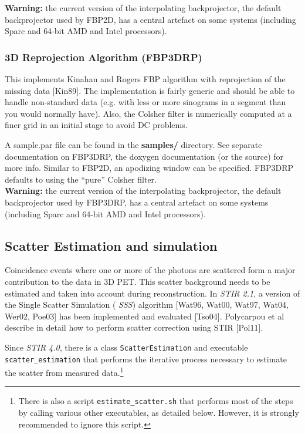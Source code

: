 \documentclass{article}
\begin{document}
\textbf{Warning:} the current version of the interpolating backprojector, 
the default backprojector used by FBP2D, has a central artefact 
on some systems (including Sparc and 64-bit AMD and Intel processors). 


\subsubsection{
3D Reprojection Algorithm (FBP3DRP)}

This implements Kinahan and Rogers FBP algorithm with reprojection 
of the missing data [Kin89]. The implementation is fairly generic 
and should be able to handle non-standard data (e.g. with less 
or more sinograms in a segment than you would normally have). 
Also, the Colsher filter is numerically computed at a finer grid 
in an initial stage to avoid DC problems.


A sample.par file can be found in the \textbf{samples/} 
directory. See separate documentation on FBP3DRP, the doxygen documentation 
(or the source) for more info. Similar to FBP2D, an apodizing window can be specified.
FBP3DRP defaults to using the ``pure'' Colsher filter. \\
\textbf{Warning:} the current version of the interpolating backprojector, 
the default backprojector used by FBP3DRP, has a central artefact 
on some systems (including Sparc and 64-bit AMD and Intel processors).

\subsection{
Scatter Estimation and simulation}
Coincidence events where one or more of the photons are scattered form a major contribution to the data
in 3D PET. This scatter background needs to be estimated and taken into account during reconstruction. In
\textit{STIR 2.1}, a version of the Single Scatter Simulation ( \textit{SSS}) algorithm [Wat96, Wat00,
Wat97, Wat04, Wer02, Poe03] has been implemented and evaluated [Tso04].
Polycarpou et al describe in detail how to perform scatter correction
using STIR [Pol11].

Since \textit{STIR 4.0}, there is a class \texttt{ScatterEstimation} and executable
\texttt{scatter\_estimation} that performs the iterative process necessary to estimate
the scatter from measured data.\footnote{%
There is also a script \texttt{estimate\_scatter.sh} that performs most of the steps by
calling various other executables, as detailed below. However, it is strongly recommended to
ignore this script.}
\end{document}
